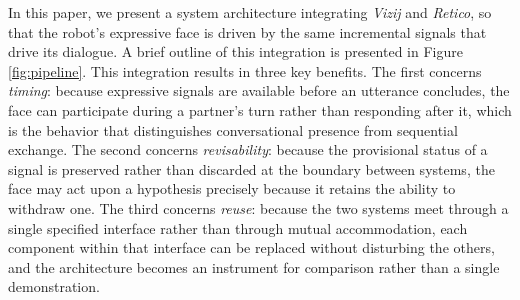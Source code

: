 \documentclass[conference]{IEEEtran}
\begin{document}
In this paper, we present a system architecture integrating \textit{Vizij} and \textit{Retico}, so that the robot's expressive face is driven by the same incremental signals that drive its dialogue. A brief outline of this integration is presented in Figure \ref{fig:pipeline}. This integration results in three key benefits. The first concerns \textit{timing}: because expressive signals are available before an utterance concludes, the face can participate during a partner's turn rather than responding after it, which is the behavior that distinguishes conversational presence from sequential exchange. The second concerns \textit{revisability}: because the provisional status of a signal is preserved rather than discarded at the boundary between systems, the face may act upon a hypothesis precisely because it retains the ability to withdraw one. The third concerns \textit{reuse}: because the two systems meet through a single specified interface rather than through mutual accommodation, each component within that interface can be replaced without disturbing the others, and the architecture becomes an instrument for comparison rather than a single demonstration.
\end{document}
